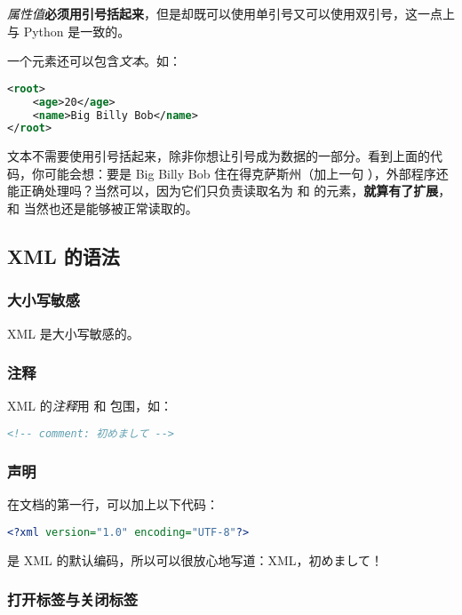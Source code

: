 \emph{属性值}\textbf{必须用引号括起来}，但是却既可以使用单引号又可以使用双引号，这一点上与 Python 是一致的。

一个元素还可以包含\emph{文本}。如：
\begin{lstlisting}[language = xml]
<root>
    <age>20</age>
    <name>Big Billy Bob</name>
</root>
\end{lstlisting}

文本不需要使用引号括起来，除非你想让引号成为数据的一部分。看到上面的代码，你可能会想：要是 Big Billy Bob 住在得克萨斯州（加上一句 ），外部程序还能正确处理吗？当然可以，因为它们只负责读取名为  和  的元素，\textbf{就算有了扩展}， 和  当然也还是能够被正常读取的。

\subsection{XML 的语法\cite{XMLrunoob2}}

\subsubsection{大小写敏感}

XML 是大小写敏感的。

\subsubsection{注释}

XML 的\emph{注释}用 \code{<!--} 和 \code{-->} 包围，如：
\begin{lstlisting}[language = xml]
<!-- comment: 初めまして -->
\end{lstlisting}

\subsubsection{声明}

在文档的第一行，可以加上以下代码：
\begin{lstlisting}[language = xml]
<?xml version="1.0" encoding="UTF-8"?>
\end{lstlisting}

 是 XML 的默认编码，所以可以很放心地写道：XML，初めまして！

\subsubsection{打开标签与关闭标签}

